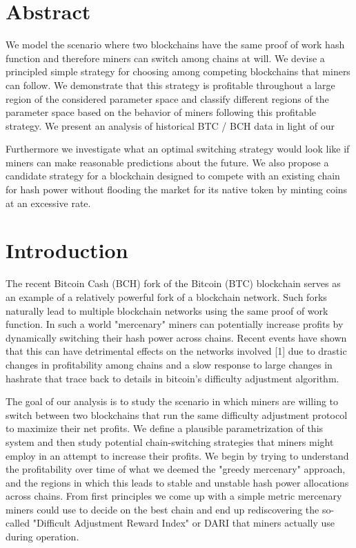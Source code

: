 \documentclass[12pt, preprint]{aastex}
\begin{document}
\section*{Abstract}
We model the scenario where two blockchains have the same proof of work hash function and therefore miners can switch among chains at will.  We devise a principled simple strategy for choosing among competing blockchains that miners can follow.  We demonstrate that this strategy is profitable throughout a large region of the considered parameter space and classify different regions of the parameter space based on the behavior of miners following this profitable strategy.  We present an analysis of historical BTC / BCH data in light of our 

Furthermore we investigate what an optimal switching strategy would look like if miners can make reasonable predictions about the future.  We also propose a candidate strategy for a blockchain designed to compete with an existing chain for hash power without flooding the market for its native token by minting coins at an excessive rate.

\section*{Introduction}
The recent Bitcoin Cash (BCH) fork of the Bitcoin (BTC) blockchain serves as an example of a relatively powerful fork of a blockchain network.  Such forks naturally lead to multiple blockchain networks using the same proof of work function.  In such a world "mercenary" miners can potentially increase profits by dynamically switching their hash power across chains.  Recent events have shown that this can have detrimental effects on the networks involved [1] due to drastic changes in profitability among chains and a slow response to large changes in hashrate that trace back to details in bitcoin's difficulty adjustment algorithm.

The goal of our analysis is to study the scenario in which miners are willing to switch between two blockchains that run the same difficulty adjustment protocol to maximize their net profits.  We define a plausible parametrization of this system and then study potential chain-switching strategies that miners might employ in an attempt to increase their profits.  We begin by trying to understand the profitability over time of what we deemed the "greedy mercenary" approach, and the regions in which this leads to stable and unstable hash power allocations across chains.  From first principles we come up with a simple metric mercenary miners could use to decide on the best chain and end up rediscovering the so-called "Difficult Adjustment Reward Index" or DARI that miners actually use during operation. 
\end{document}
